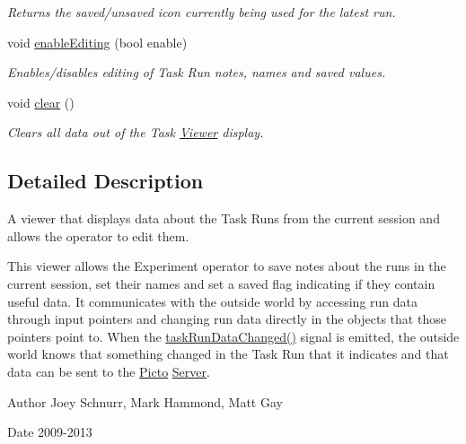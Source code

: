 \begin{DoxyCompactItemize}
\begin{DoxyCompactList}\small\item\em Returns the saved/unsaved icon currently being used for the latest run. \end{DoxyCompactList}\item 
void \hyperlink{class_task_run_viewer_ab359424cacdb5fc4498340f18ea19b5f}{enable\-Editing} (bool enable)
\begin{DoxyCompactList}\small\item\em Enables/disables editing of Task Run notes, names and saved values. \end{DoxyCompactList}\item 
\hypertarget{class_task_run_viewer_a8a659aa6a4e4af0ff6e329a4be38dfdf}{void \hyperlink{class_task_run_viewer_a8a659aa6a4e4af0ff6e329a4be38dfdf}{clear} ()}\label{class_task_run_viewer_a8a659aa6a4e4af0ff6e329a4be38dfdf}

\begin{DoxyCompactList}\small\item\em Clears all data out of the Task \hyperlink{class_viewer}{Viewer} display. \end{DoxyCompactList}\end{DoxyCompactItemize}


\subsection{Detailed Description}
A viewer that displays data about the Task Runs from the current session and allows the operator to edit them. 

This viewer allows the Experiment operator to save notes about the runs in the current session, set their names and set a saved flag indicating if they contain useful data. It communicates with the outside world by accessing run data through input pointers and changing run data directly in the objects that those pointers point to. When the \hyperlink{class_task_run_viewer_a22b9bd020d482ef8bd1dce2c17e32332}{task\-Run\-Data\-Changed()} signal is emitted, the outside world knows that something changed in the Task Run that it indicates and that data can be sent to the \hyperlink{namespace_picto}{Picto} \hyperlink{class_server}{Server}. \begin{DoxyAuthor}{Author}
Joey Schnurr, Mark Hammond, Matt Gay 
\end{DoxyAuthor}
\begin{DoxyDate}{Date}
2009-\/2013 
\end{DoxyDate}


